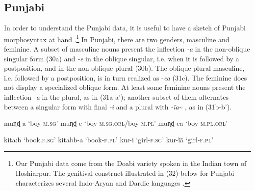 \documentclass[output=paper]{langsci/langscibook}
\begin{document}
\subsection{Punjabi}%
In order to understand the Punjabi data, it is useful to have a sketch of Punjabi morphosyntax at hand \citep{Bhatia2000}.\footnote{{Our Punjabi data come} from the Doabi variety spoken in the Indian town of Hoshiarpur. {The genitival construct illustrated in (32) below for Punjabi characterizes several Indo-Aryan and Dardic languages \citep{Payne1995}.} }{} In Punjabi, there are two genders, masculine and feminine. A subset of masculine nouns present the inflection \textit{{}-a} in the non-oblique singular form (30a) and \textit{{}-e} in the oblique singular, i.e. when it is followed by a postposition, and in the non-oblique plural (30b). The oblique plural masculine, i.e. followed by a postposition, is in turn realized as -\textit{ea} (31c). The feminine does not display a specialized oblique form. At least some feminine nouns present the inflection \textit{{}-a} in the plural, as in (31a-a’); another subset of them alternates between a singular form with final \textit{{}-i} and a plural with \textit{{}-ĩa}\~{} , as in (31b-b’). 

\ea%
    \label{ex:manzini:30}
    \ea muɳɖ-a
        \glt ‘boy-\textsc{m.sg}’
    \ex muɳɖ-e
        \glt ‘boy-\textsc{m.sg.obl}/boy-\textsc{m.pl}’  
    \ex muɳɖ-ea
        \glt ‘boy-\textsc{m.pl.obl}’
\z
\z

\ea%
    \label{ex:manzini:31}
        \begin{xlista}
        \ex  kita:b        
        \glt ‘book.\textsc{f.sg}’
         kitabb-a      
        \glt      ‘book-\textsc{f.pl}’ 
        \ex   kuɾ-i         
        \glt  ‘girl-\textsc{f.sg}’
          kuɾ-ĩã         
        \glt      ‘girl-\textsc{f.pl}’
        \end{xlista}
\z
\end{document}
